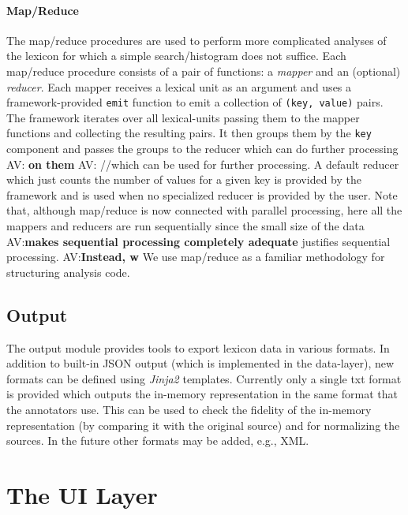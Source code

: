 \documentclass[10pt, a4paper]{article}
\newcommand{\py}[1]{{\tt #1}}
\newcommand{\av}[1]{{\color{ansa} AV: #1}}
\newcommand{\avout}[2][]{{\color{ansa} AV:}{\color{lightgray}\textbf{#2}} {\color{ansa} #1}}
\begin{document}
\paragraph{Map/Reduce} The map/reduce procedures are used to perform more complicated analyses of the lexicon
for which a simple search/histogram does not suffice. Each map/reduce procedure consists of a pair of functions:
a \emph{mapper} and an (optional) \emph{reducer}. Each mapper receives a lexical unit as an argument and
uses a framework-provided \py{emit} function to emit a collection of \py{(key, value)} pairs. The framework
iterates over all lexical-units passing them to the mapper functions and collecting the resulting pairs. It then groups them by the \py{key} component and passes the groups to the reducer which can do further processing\avout{ on them}\av{//which can be used for further processing}.
A default reducer which just counts the number of values for a given key is provided by the framework and is
used when no specialized reducer is provided by the user. Note that, although map/reduce is now connected with
parallel processing, here all the mappers and reducers are run sequentially since the small size of the data \avout[justifies sequential processing]{makes
sequential processing completely adequate}. \avout[W]{Instead, w}e use map/reduce as a familiar methodology for structuring
analysis code.

\subsection{Output}

The output module provides tools to export lexicon data in various formats. In addition to built-in JSON
output (which is implemented in the data-layer), new formats can be defined using \emph{Jinja2} \cite{tool:Jinja2} templates.
Currently only a single txt format is provided which outputs the in-memory representation in the same
format that the annotators use. This can be used to check the fidelity of the in-memory representation
(by comparing it with the original source) and for normalizing the sources. In the future other formats
may be added, e.g., XML.


\section{The UI Layer}
\end{document}
